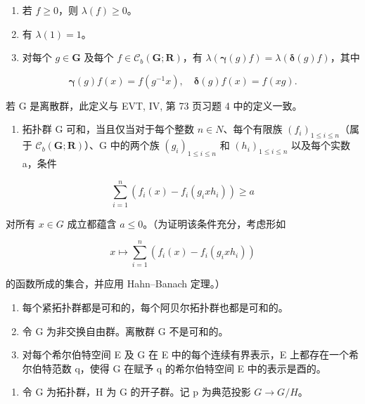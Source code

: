 \begin{enumerate}
\def\labelenumi{(\roman{enumi})}
\item
  若 \(f \geqslant 0\)，则 \(\lambda(f) \geqslant 0\)。
\item
  有 \(\lambda(1)=1\)。
\item
  对每个 \(g \in \mathbf{G}\) 及每个 \(f \in \mathcal{C}_b(\mathbf{G};\mathbf{R})\)，有 \(\lambda(\boldsymbol{\gamma}(g)f) = \lambda(\boldsymbol{\delta}(g)f)\)，其中
\end{enumerate}

\[
\boldsymbol {\gamma} (g) f (x) = f \left(g ^ {- 1} x\right), \quad \boldsymbol {\delta} (g) f (x) = f (x g).
\]

若 G 是离散群，此定义与 EVT, IV, 第 73 页习题 4 中的定义一致。

\begin{enumerate}
\def\labelenumi{\alph{enumi})}
\tightlist
\item
  拓扑群 G 可和，当且仅当对于每个整数 \(n \in N\)、每个有限族 \((f_i)_{1 \leqslant i \leqslant n}\)（属于 \(\mathcal{C}_b(\mathbf{G}; \mathbf{R})\)）、G 中的两个族 \((g_i)_{1 \leqslant i \leqslant n}\) 和 \((h_i)_{1 \leqslant i \leqslant n}\) 以及每个实数 a，条件
\end{enumerate}

\[
\sum_ {i = 1} ^ {n} (f _ {i} (x) - f _ {i} (g _ {i} x h _ {i})) \geqslant a
\]

对所有 \(x \in G\) 成立都蕴含 \(a \leqslant 0\)。（为证明该条件充分，考虑形如

\[
x \mapsto \sum_ {i = 1} ^ {n} (f _ {i} (x) - f _ {i} (g _ {i} x h _ {i}))
\]

的函数所成的集合，并应用 Hahn--Banach 定理。）

\begin{enumerate}
\def\labelenumi{\alph{enumi})}
\setcounter{enumi}{1}
\item
  每个紧拓扑群都是可和的，每个阿贝尔拓扑群也都是可和的。
\item
  令 G 为非交换自由群。离散群 G 不是可和的。
\item
  对每个希尔伯特空间 E 及 G 在 E 中的每个连续有界表示，E 上都存在一个希尔伯特范数 q，使得 G 在赋予 q 的希尔伯特空间 E 中的表示是酉的。
\end{enumerate}

\begin{enumerate}
\def\labelenumi{\arabic{enumi})}
\setcounter{enumi}{4}
\tightlist
\item
  令 G 为拓扑群，H 为 G 的开子群。记 p 为典范投影 \(G \rightarrow G/H\)。
\end{enumerate}

